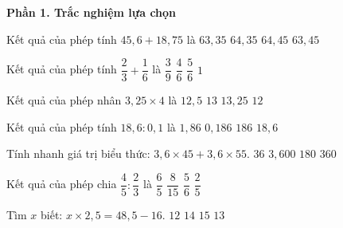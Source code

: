 \textbf{Phần 1. Trắc nghiệm lựa chọn}

\begin{ex} %
Kết quả của phép tính $45{,}6 + 18{,}75$ là
\choice
{$63{,}35$}
{\True $64{,}35$}
{$64{,}45$}
{$63{,}45$}
\end{ex}

\begin{ex} %
Kết quả của phép tính $\dfrac{2}{3} + \dfrac{1}{6}$ là
\choice
{$\dfrac{3}{9}$}
{$\dfrac{4}{6}$}
{\True $\dfrac{5}{6}$}
{$1$}
\end{ex}

\begin{ex} %
Kết quả của phép nhân $3{,}25 \times 4$ là
\choice
{$12{,}5$}
{\True $13$}
{$13{,}25$}
{$12$}
\end{ex}

\begin{ex} %
Kết quả của phép tính $18{,}6 : 0{,}1$ là
\choice
{$1{,}86$}
{$0{,}186$}
{\True $186$}
{$18{,}6$}
\end{ex}

\begin{ex} %
Tính nhanh giá trị biểu thức: $3{,}6 \times 45 + 3{,}6 \times 55$.
\choice
{$36$}
{$3,600$}
{$180$}
{\True $360$}
\end{ex}

\begin{ex} %
Kết quả của phép chia $\dfrac{4}{5} : \dfrac{2}{3}$ là
\choice
{\True $\dfrac{6}{5}$}
{$\dfrac{8}{15}$}
{$\dfrac{5}{6}$}
{$\dfrac{2}{5}$}
\end{ex}

\begin{ex} %
Tìm $x$ biết: $x \times 2{,}5 = 48{,}5 - 16$.
\choice
{$12$}
{$14$}
{$15$}
{\True $13$}
\end{ex}

